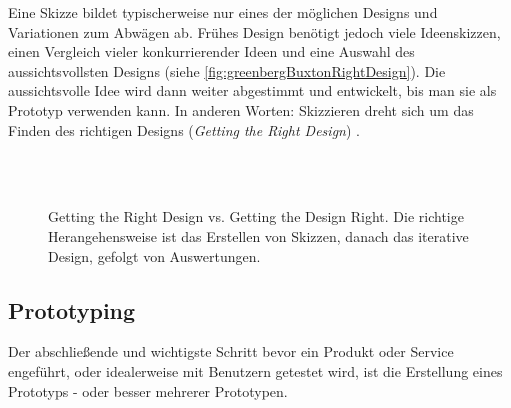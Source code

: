 \medskip Eine Skizze bildet typischerweise nur eines der möglichen Designs und Variationen zum Abwägen ab. Frühes Design benötigt jedoch viele Ideenskizzen, einen Vergleich vieler konkurrierender Ideen und eine Auswahl des aussichtsvollsten Designs (siehe \autoref{fig:greenbergBuxtonRightDesign}). Die aussichtsvolle Idee wird dann weiter abgestimmt und entwickelt, bis man sie als Prototyp verwenden kann. In anderen Worten: Skizzieren dreht sich um das Finden des richtigen Designs (\emph{Getting the Right Design}) \citep{Tohidi:2006, Buxton:2007, Greenberg:2008}. 

\begin{figure}
	\myfloatalign
	 \\
	 \\
	\caption[Getting the Right Design vs. Getting the Design Right. \newline \citep{Greenberg:2008}]{Getting the Right Design vs. Getting the Design Right. Die richtige Herangehensweise ist das Erstellen von Skizzen, danach das iterative Design, gefolgt von Auswertungen.}\label{fig:greenbergBuxtonRightDesign}
\end{figure}

\subsection{Prototyping}
Der abschließende und wichtigste Schritt bevor ein Produkt oder Service engeführt, oder idealerweise mit Benutzern getestet wird, ist die Erstellung eines Prototyps - oder besser mehrerer Prototypen.


